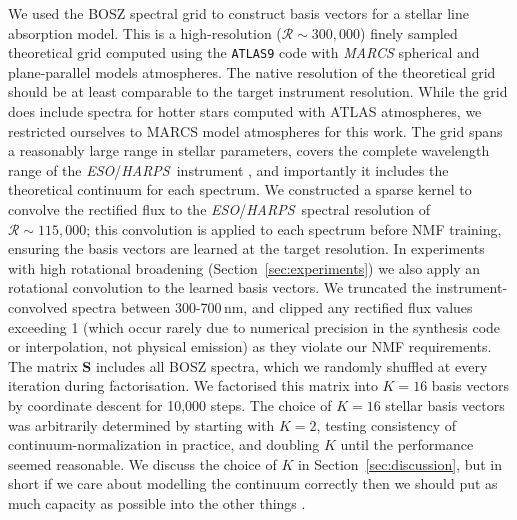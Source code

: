\documentclass[modern,linenumbers]{aastex631}
\newcommand{\norm}[1]{\left\lVert#1\right\rVert}
\newcommand{\project}[1]{\textit{#1}}
\renewcommand{\vec}[1]{\mathbf{#1}}
\newcommand{\eso}{\project{ESO}}
\newcommand{\harps}{\project{HARPS}}
\newcommand*{\transpose}{^{\mkern-1.5mu\mathsf{T}}}
\newcommand{\todo}[1]{\textcolor{tab:red}{#1}}
\renewcommand{\added}[1]{#1}
\begin{document}
We used the BOSZ spectral grid \citep{Bohlin:2017} to construct basis vectors for a stellar line absorption model. This is a high-resolution ($\mathcal{R} \sim 300{,}000$) finely sampled theoretical grid computed using the \texttt{ATLAS9} code with \project{MARCS} spherical and plane-parallel models atmospheres. \added{The native resolution of the theoretical grid should be at least comparable to the target instrument resolution.} While the grid does include spectra for hotter stars computed with ATLAS atmospheres, we restricted ourselves to MARCS model atmospheres for this work. The grid spans a reasonably large range in stellar parameters, covers the complete wavelength range of the \eso/\harps\ instrument \citep{2003Msngr.114...20M}, and importantly it includes the theoretical continuum for each spectrum. We constructed a sparse kernel to convolve the rectified flux to the \eso/\harps\ spectral resolution of $\mathcal{R} \sim 115{,}000$\added{; this convolution is applied to each spectrum before NMF training, ensuring the basis vectors are learned at the target resolution. In experiments with high rotational broadening (Section~\ref{sec:experiments}) we also apply an rotational convolution to the learned basis vectors}. We truncated the instrument-convolved spectra between 300-700\,nm, and clipped any rectified flux values exceeding 1 \added{(which occur rarely due to numerical precision in the synthesis code or interpolation, not physical emission)} as they violate our NMF requirements. The matrix $\vec{S}$ includes all BOSZ spectra, which we randomly shuffled at every iteration during factorisation. We factorised this matrix into $K = 16$ basis vectors by coordinate descent for {10,000} steps. \added{The choice of $K=16$ stellar basis vectors was arbitrarily determined by starting with $K=2$, testing consistency of continuum-normalization in practice, and doubling $K$ until the performance seemed reasonable. We discuss the choice of $K$ in Section~\ref{sec:discussion}, but in short if we care about modelling the continuum correctly then we should put as much capacity as possible into the other things \citep[e.g., stellar absorption by making $K$ very high;][]{Bickel:1998}.}\\


\end{document}
